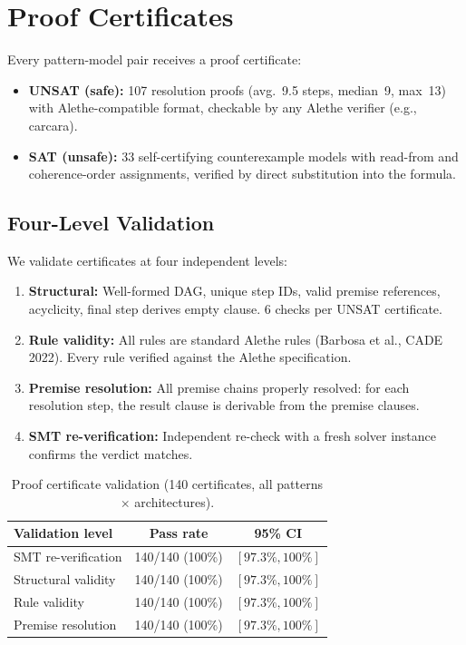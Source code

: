 \documentclass[11pt]{article}
\begin{document}
\section{Proof Certificates}
\label{sec:certificates}

Every pattern-model pair receives a proof certificate:
\begin{itemize}[nosep]
\item \textbf{UNSAT (safe):} 107 resolution proofs
  (avg.~9.5 steps, median~9, max~13) with Alethe-compatible
  format, checkable by any Alethe verifier (e.g., carcara).
\item \textbf{SAT (unsafe):} 33 self-certifying counterexample models
  with read-from and coherence-order assignments, verified by
  direct substitution into the formula.
\end{itemize}

\subsection{Four-Level Validation}

We validate certificates at four independent levels:
\begin{enumerate}[nosep]
\item \textbf{Structural:} Well-formed DAG, unique step IDs,
  valid premise references, acyclicity, final step derives
  empty clause. 6 checks per UNSAT certificate.
\item \textbf{Rule validity:} All rules are standard Alethe rules
  (Barbosa et al., CADE 2022). Every rule verified against
  the Alethe specification.
\item \textbf{Premise resolution:} All premise chains properly
  resolved: for each resolution step, the result clause is
  derivable from the premise clauses.
\item \textbf{SMT re-verification:} Independent re-check with
  a fresh solver instance confirms the verdict matches.
\end{enumerate}

\begin{table}[ht]
\centering
\caption{Proof certificate validation (140 certificates, all patterns $\times$ architectures).}
\label{tab:proof-validation}
\small
\begin{tabular}{lcc}
\toprule
\textbf{Validation level} & \textbf{Pass rate} & \textbf{95\% CI} \\
\midrule
SMT re-verification & 140/140 (100\%) & $[97.3\%, 100\%]$ \\
Structural validity & 140/140 (100\%) & $[97.3\%, 100\%]$ \\
Rule validity & 140/140 (100\%) & $[97.3\%, 100\%]$ \\
Premise resolution & 140/140 (100\%) & $[97.3\%, 100\%]$ \\
\bottomrule
\end{tabular}
\end{table}
\end{document}
